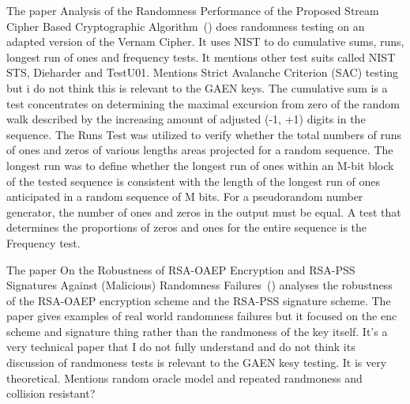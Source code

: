 The paper Analysis of the Randomness Performance of the Proposed Stream Cipher Based Cryptographic Algorithm~(\cite{9232553}) does randomness testing on an adapted version of the Vernam Cipher. It uses NIST to do cumulative sums, runs, longest run of ones and frequency tests. It mentions other test suits called NIST STS, Dieharder and TestU01. Mentions Strict Avalanche Criterion (SAC) testing but i do not think this is relevant to the GAEN keys. The cumulative sum is a test concentrates on determining the maximal excursion from zero of the random walk described by the increasing amount of adjusted (-1, +1) digits in the sequence. The Runs Test was utilized to verify whether the total numbers of runs of ones and zeros of various lengths areas projected for a random sequence. The longest run was to define whether the longest run of ones within an M-bit block of the tested sequence is consistent with the length of the longest run of ones anticipated in a random sequence of M bits. For a pseudorandom number generator, the number of ones and zeros in the output must be equal. A test that determines the proportions of zeros and ones for the entire sequence is the Frequency test.\par

The paper On the Robustness of RSA-OAEP Encryption and RSA-PSS Signatures Against (Malicious) Randomness Failures~(\cite{10.1145/3052973.3053040}) analyses the robustness of the RSA-OAEP encryption scheme and the RSA-PSS signature scheme. The paper gives examples of real world randomness failures but it focused on the enc scheme and signature thing rather than the randmoness of the key itself. It's a very technical paper that I do not fully understand and do not think its discussion of randmoness tests is relevant to the GAEN kesy testing. It is very theoretical. Mentions random oracle model and repeated randmoness and collision resistant? \par


